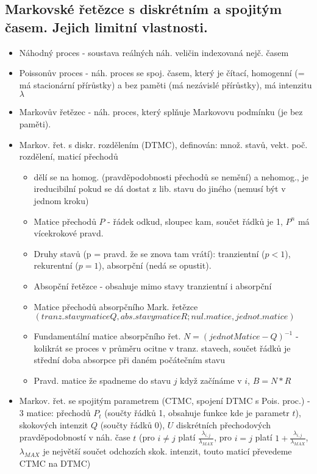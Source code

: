 \documentclass[a4paper,hidelinks]{article}
\begin{document}
\subsection{Markovské řetězce s diskrétním a spojitým časem. Jejich limitní vlastnosti.}

\begin{itemize}
    \item Náhodný proces - soustava reálných náh. veličin indexovaná nejč. časem
    \item Poissonův proces - náh. proces se spoj. časem, který je čítací, homogenní (= má stacionární přírůstky) a bez paměti (má nezávislé přírůstky), má intenzitu $\lambda$
    \item Markovův řetězec - náh. proces, který splňuje Markovovu podmínku (je bez paměti).
    \item Markov. řet. s diskr. rozdělením (DTMC), definován: množ. stavů, vekt. poč. rozdělení, maticí přechodů
    \begin{itemize}
        \item dělí se na homog. (pravděpodobnosti přechodů se nemění) a nehomog., je ireducibilní pokud se dá dostat z lib. stavu do jiného (nemusí být v jednom kroku)
        \item Matice přechodů $P$ - řádek odkud, sloupec kam, součet řádků je 1, $P^n$ má vícekrokové pravd.
        \item Druhy stavů (p = pravd. že se znova tam vrátí): tranzientní ($p<1$), rekurentní ($p=1$), absorpční (nedá se opustit).
        \item Absopční řetězce - obsahuje mimo stavy tranzientní i absorpční
        \item Matice přechodů absorpčního Mark. řetězce $(tranz. stavy matice Q, abs. stavy matice R; nul. matice, jednot. matice)$
        \item Fundamentální matice absorpčního řet. $N = (jednotMatice - Q)^{-1}$ - kolikrát se proces v průměru ocitne v tranz. stavech, součet řádků je střední doba absorpce při  daném počátečním stavu
        \item Pravd. matice že spadneme do stavu $j$ když začínáme v $i$, $B = N * R$
    \end{itemize}
    \item Markov. řet. se spojitým parametrem (CTMC, spojení DTMC s Pois. proc.) - 3 matice: přechodů $P_t$ (součty řádků 1, obsahuje funkce kde je parametr $t$), skokových intenzit $Q$ (součty řádků 0), $U$ diskrétních přechodových pravděpodobností v náh. čase $t$ (pro $i\neq j$ platí $\frac{\lambda_{i,j}}{\lambda_{MAX}}$, pro $i=j$ platí $1+\frac{\lambda_{i,j}}{\lambda_{MAX}}$, $\lambda_{MAX}$ je největší součet odchozích skok. intenzit, touto maticí převedeme CTMC na DTMC)

\end{itemize}
\end{document}
